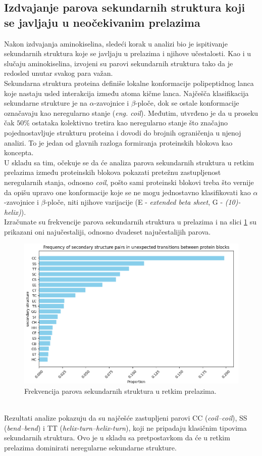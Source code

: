 \documentclass[a4paper,12pt]{article}
\begin{document}
\subsection{Izdvajanje parova sekundarnih struktura koji se javljaju u neočekivanim prelazima}
Nakon izdvajanja aminokiselina, sledeći korak u analizi bio je ispitivanje sekundarnih struktura koje se javljaju u prelazima i njihove učestalosti. Kao i u slučaju aminokiselina, izvojeni su parovi sekundarnih struktura tako da je redosled unutar svakog para važan. \\
Sekundarna struktura proteina definiše lokalne konformacije polipeptidnog lanca koje nastaju usled interakcija između atoma kičme lanca. Najčešča klasifikacija sekundarne strukture je na $\alpha$-zavojnice i $\beta$-ploče, dok se ostale konformacije označavaju kao neregularno stanje (\textit{eng. coil}). Međutim, utvrđeno je da u proseku čak $50\%$ ostataka \cite{debrevern2010proteinblocks} kolektivno tretira kao neregularno stanje što značajno pojednostavljuje strukturu proteina i dovodi do brojnih ograničenja u njenoj analizi. To je jedan od glavnih razloga formiranja proteinskih blokova kao koncepta. \\ 
U skladu sa tim, očekuje se da će analiza parova sekundarnih struktura u retkim prelazima između proteinskih blokova pokazati pretežnu zastupljenost neregularnih stanja, odnosno \textit{coil}, pošto sami proteinski blokovi treba što vernije da opišu upravo one konformacije koje se ne mogu jednostavno klasifikovati kao $\alpha$-zavojnice i $\beta$-ploče, niti njihove varijacije (E - \textit{extended beta sheet}, G - \textit{(10)-helix)}). \\
Izračunate su frekvencije parova sekundarnih struktura u prelazima i na slici \ref{Slika:s2freq} su prikazani oni najučestaliji, odnosno dvadeset najučestalijih parova.
\begin{figure}[htbp]
    \centering
    \includegraphics[width=1\textwidth]{./images/s2freq.png}
    \caption{Frekvencija parova sekundarnih struktura u retkim prelazima.}
    \label{Slika:s2freq}
\end{figure}
\\
Rezultati analize pokazuju da su najčešće zastupljeni parovi CC (\textit{coil–coil}), SS (\textit{bend–bend}) i TT (\textit{helix-turn–helix-turn}), koji ne pripadaju klasičnim tipovima sekundarnih struktura. Ovo je u skladu sa pretpostavkom da će u retkim prelazima dominirati neregularne sekundarne strukture.
\end{document}
